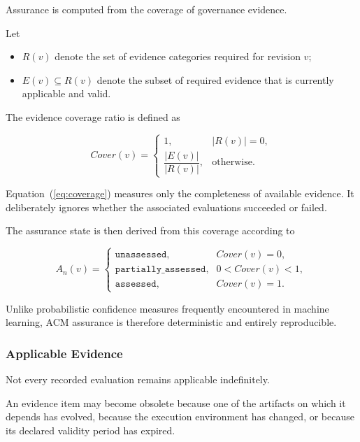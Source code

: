 \documentclass[10pt]{article}
\begin{document}
Assurance is computed from the coverage of governance evidence.

Let

\begin{itemize}
    \item \(R(v)\) denote the set of evidence categories required for revision
    \(v\);
    \item \(E(v)\subseteq R(v)\) denote the subset of required evidence that is
    currently applicable and valid.
\end{itemize}

The evidence coverage ratio is defined as

\begin{equation}
Cover(v)
=
\begin{cases}
1,
&
|R(v)|=0,
\\[0.3em]
\dfrac{|E(v)|}{|R(v)|},
&
\text{otherwise.}
\end{cases}
\label{eq:coverage}
\end{equation}

Equation~(\ref{eq:coverage}) measures only the completeness of available
evidence. It deliberately ignores whether the associated evaluations succeeded
or failed.

The assurance state is then derived from this coverage according to

\begin{equation}
A_n(v)
=
\begin{cases}
\texttt{unassessed},
&
Cover(v)=0,
\\[0.3em]
\texttt{partially\_assessed},
&
0<Cover(v)<1,
\\[0.3em]
\texttt{assessed},
&
Cover(v)=1.
\end{cases}
\label{eq:assurance_from_coverage}
\end{equation}

Unlike probabilistic confidence measures frequently encountered in machine
learning, ACM assurance is therefore deterministic and entirely reproducible.

\subsubsection{Applicable Evidence}

Not every recorded evaluation remains applicable indefinitely.

An evidence item may become obsolete because one of the artifacts on which it
depends has evolved, because the execution environment has changed, or because
its declared validity period has expired.
\end{document}
